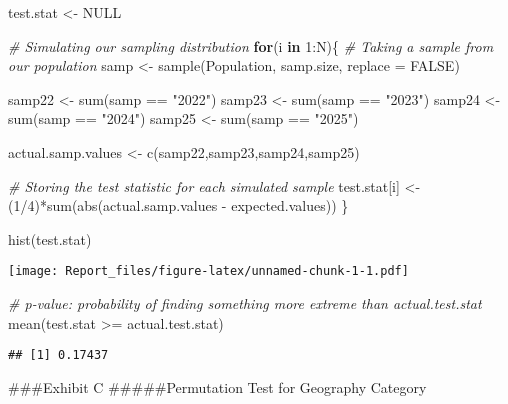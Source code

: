 \documentclass[
]{article}
\newenvironment{Shaded}{\begin{snugshade}}{\end{snugshade}}
\newcommand{\AttributeTok}[1]{\textcolor[rgb]{0.77,0.63,0.00}{#1}}
\newcommand{\CommentTok}[1]{\textcolor[rgb]{0.56,0.35,0.01}{\textit{#1}}}
\newcommand{\ConstantTok}[1]{\textcolor[rgb]{0.00,0.00,0.00}{#1}}
\newcommand{\ControlFlowTok}[1]{\textcolor[rgb]{0.13,0.29,0.53}{\textbf{#1}}}
\newcommand{\DecValTok}[1]{\textcolor[rgb]{0.00,0.00,0.81}{#1}}
\newcommand{\FunctionTok}[1]{\textcolor[rgb]{0.00,0.00,0.00}{#1}}
\newcommand{\NormalTok}[1]{#1}
\newcommand{\OtherTok}[1]{\textcolor[rgb]{0.56,0.35,0.01}{#1}}
\newcommand{\SpecialCharTok}[1]{\textcolor[rgb]{0.00,0.00,0.00}{#1}}
\newcommand{\StringTok}[1]{\textcolor[rgb]{0.31,0.60,0.02}{#1}}
\begin{document}
\begin{Shaded}
\begin{Highlighting}[]
\NormalTok{test.stat }\OtherTok{\textless{}{-}} \ConstantTok{NULL}

\CommentTok{\# Simulating our sampling distribution}
\ControlFlowTok{for}\NormalTok{(i }\ControlFlowTok{in} \DecValTok{1}\SpecialCharTok{:}\NormalTok{N)\{}
  \CommentTok{\# Taking a sample from our population}
\NormalTok{  samp }\OtherTok{\textless{}{-}} \FunctionTok{sample}\NormalTok{(Population, samp.size, }\AttributeTok{replace =} \ConstantTok{FALSE}\NormalTok{)}
  
\NormalTok{  samp22 }\OtherTok{\textless{}{-}} \FunctionTok{sum}\NormalTok{(samp }\SpecialCharTok{==} \StringTok{"2022"}\NormalTok{)}
\NormalTok{  samp23 }\OtherTok{\textless{}{-}} \FunctionTok{sum}\NormalTok{(samp }\SpecialCharTok{==} \StringTok{"2023"}\NormalTok{)}
\NormalTok{  samp24 }\OtherTok{\textless{}{-}} \FunctionTok{sum}\NormalTok{(samp }\SpecialCharTok{==} \StringTok{"2024"}\NormalTok{)}
\NormalTok{  samp25 }\OtherTok{\textless{}{-}} \FunctionTok{sum}\NormalTok{(samp }\SpecialCharTok{==} \StringTok{"2025"}\NormalTok{)}
  
\NormalTok{  actual.samp.values }\OtherTok{\textless{}{-}} \FunctionTok{c}\NormalTok{(samp22,samp23,samp24,samp25)}
  
  \CommentTok{\# Storing the test statistic for each simulated sample}
\NormalTok{  test.stat[i] }\OtherTok{\textless{}{-}}\NormalTok{ (}\DecValTok{1}\SpecialCharTok{/}\DecValTok{4}\NormalTok{)}\SpecialCharTok{*}\FunctionTok{sum}\NormalTok{(}\FunctionTok{abs}\NormalTok{(actual.samp.values }\SpecialCharTok{{-}}\NormalTok{ expected.values))}
\NormalTok{\}}

\FunctionTok{hist}\NormalTok{(test.stat)}
\end{Highlighting}
\end{Shaded}

\texttt{[image: Report\_files/figure-latex/unnamed-chunk-1-1.pdf]}

\begin{Shaded}
\begin{Highlighting}[]
\CommentTok{\# p{-}value: probability of finding something more extreme than actual.test.stat}
\FunctionTok{mean}\NormalTok{(test.stat }\SpecialCharTok{\textgreater{}=}\NormalTok{ actual.test.stat)}
\end{Highlighting}
\end{Shaded}

\begin{verbatim}
## [1] 0.17437
\end{verbatim}

\#\#\#Exhibit C \#\#\#\#\#Permutation Test for Geography Category
\end{document}
